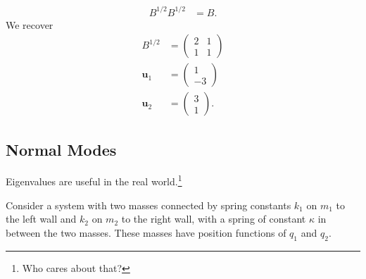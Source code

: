 \documentclass[10pt]{mypackage}
\begin{document}
\begin{example}
  \begin{align*}
    B^{1/2}B^{1/2} &= B.
  \end{align*}
  We recover
  \begin{align*}
    B^{1/2} &= \begin{pmatrix}2 & 1 \\ 1 & 1\end{pmatrix}\\
    \mathbf{u}_1 &= \begin{pmatrix}1\\-3\end{pmatrix}\\
    \mathbf{u}_2 &= \begin{pmatrix}3\\1\end{pmatrix}.
  \end{align*}
  
\end{example}
\subsection{Normal Modes}%
Eigenvalues are useful in the real world.\footnote{Who cares about that?}\newline

Consider a system with two masses connected by spring constants $k_1$ on $m_1$ to the left wall and $k_2$ on $m_2$ to the right wall, with a spring of constant $\kappa$ in between the two masses. These masses have position functions of $q_1$ and $q_2$.\newline
\end{document}
